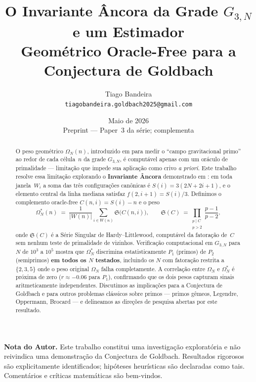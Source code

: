 \documentclass[12pt,a4paper]{article}
\title{%
	O Invariante Âncora da Grade $G_{3,N}$ e um Estimador\\
	Geométrico Oracle-Free para a Conjectura de Goldbach%
}
\author{%
	Tiago Bandeira\\[4pt]
	\small\texttt{tiagobandeira.goldbach2025@gmail.com}%
}
\date{Maio de 2026\\[4pt]
	\small Preprint --- Paper~3 da série; complementa \cite{bandeira2026unif,bandeira2026soma}%
}
\theoremstyle{definition}
\theoremstyle{remark}
\newcommand{\Grid}{G_{3,N}}
\newcommand{\Om}{\Omega_N}           %
\newcommand{\Oms}{\Omega^*_N}        %
\newcommand{\Ss}{\mathfrak{S}}       %
\begin{document}
	\maketitle
	
	\begin{center}
		\small\itshape
		\parbox{0.88\textwidth}{%
			\textbf{Nota do Autor.}
			Este trabalho constitui uma investigação exploratória e não reivindica
			uma demonstração da Conjectura de Goldbach.
			Resultados rigorosos são explicitamente identificados;
			hipóteses heurísticas são declaradas como tais.
			Comentários e críticas matemáticas são bem-vindos.%
		}
	\end{center}
	\bigskip
	
	\begin{abstract}
		O peso geométrico $\Om(n)$, introduzido em \cite{bandeira2026unif} para medir
		o ``campo gravitacional primo'' ao redor de cada célula~$n$ da grade $\Grid$,
		é computável apenas com um oráculo de primalidade --- limitação que impede
		sua aplicação como crivo \emph{a priori}.
		Este trabalho resolve essa limitação explorando o \textbf{Invariante Âncora}
		demonstrado em \cite{bandeira2026soma}: em toda janela~$W_i$ a soma das três
		configurações canônicas é $S(i) = 3(2N+2i+1)$, e o elemento central da
		linha mediana satisfaz $f(2,i{+}1) = S(i)/3$.
		Definimos o complemento oracle-free $C(n,i) = S(i)-n$ e o peso
		\[
		\Oms(n) \;=\; \frac{1}{|W(n)|}\sum_{i\in W(n)}\Ss\!\bigl(C(n,i)\bigr),
		\qquad
		\Ss(C) \;=\!\!\prod_{\substack{p\mid C\\p>2}}\!\frac{p-1}{p-2},
		\]
		onde $\Ss(C)$ é a Série Singular de Hardy--Littlewood, computável da
		fatoração de~$C$ sem nenhum teste de primalidade de vizinhos.
		Verificação computacional em $\Grid$ para $N$ de $10^3$ a $10^5$ mostra que
		$\Oms$ discrimina estatisticamente $P_1$ (primos) de $P_2$ (semiprimos)
		\textbf{em todos os $N$ testados}, incluindo os $N$ com fatoração restrita
		a $\{2,3,5\}$ onde o peso original $\Om$ falha completamente.
		A correlação entre $\Om$ e $\Oms$ é próxima de zero ($r\approx-0.06$ para
		$P_1$), confirmando que os dois pesos capturam sinais aritmeticamente
		independentes.
		Discutimos as implicações para a Conjectura de Goldbach e para outros
		problemas clássicos sobre primos --- primos gêmeos, Legendre, Oppermann,
		Brocard --- e delineamos as direções de pesquisa abertas por este resultado.
	\end{abstract}
	
\end{document}
